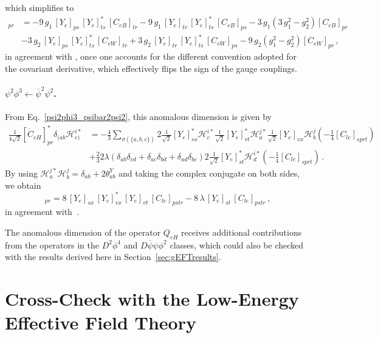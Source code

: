 which simplifies to
\begin{align}
    [\dot C_{eH}]_{pr} &= -9\,g_1\,[Y_e]_{ps}\,[Y_e]^*_{ts}\,[C_{eB}]_{tr}-9\,g_1\,[Y_e]_{tr}\,[Y_e]^*_{ts}\,[C_{eB}]_{ps}-3\,g_1\left(3\,g_1^2-g_2^2\right)[C_{eB}]_{pr}\nonumber \\
    &-3\,g_2\,[Y_e]_{ps}\,[Y_e]^*_{ts}\,[C_{eW}]_{tr}+3\,g_2\,[Y_e]_{tr}\,[Y_e]^*_{ts}\,[C_{eW}]_{ps}-9\,g_2\left(g_1^2-g_2^2\right)[C_{eW}]_{pr}\,,
\end{align}
in agreement with \cite{Alonso:2013hga}, once one accounts for the different convention adopted for the covariant derivative, which effectively flips the sign of the gauge couplings.

\paragraph{$\psi^2\phi^3 \leftarrow \overline \psi^2\psi^2$.}
From Eq.~\eqref{psi2phi3_psibar2psi2}, this anomalous dimension is given by
\begin{align}
    \frac{1}{4\sqrt{2}}[\dot C_{eH}]^*_{pr} \delta_{(ab}\mathcal H_{c)}^{i*} &=  -\frac{4}{3}\sum_{\sigma(\{a,b,c\})}2 \frac{1}{\sqrt 2}[Y_e]^*_{sx}\mathcal H_c^{i*} \frac{1}{\sqrt 2}[Y_e]^*_{vt}\mathcal H_a^{j*} \frac{1}{\sqrt 2}[Y_e]_{vx}\mathcal H_b^{j}\left(-\frac{1}{4}[C_{le}]_{sprt}\right) \nonumber \\
    &+ \frac{2}{3}2\lambda (\delta_{ab}\delta_{cd}+\delta_{ac}\delta_{bd}+\delta_{ad}\delta_{bc})2\frac{1}{\sqrt 2}[Y_e]^*_{st}\mathcal H_d^{i*} \left(-\frac{1}{4}[C_{le}]_{sprt}\right) \,.
\end{align}
By using $\mathcal H_a^{j*}\mathcal H_b^j = \delta_{ab}+2\theta^Y_{ab}$ and taking the complex conjugate on both sides, we obtain
\begin{equation}
    [\dot C_{eH}]_{pr} = 8\, [Y_e]_{sx}\,[Y_e]^*_{vx}\,[Y_e]_{vt}\,[C_{le}]_{pstr} - 8\, \lambda \,[Y_e]_{st} \,[C_{le}]_{pstr}\,,
\end{equation}
in agreement with~\cite{Jenkins:2013zja,Jenkins:2013wua}.

The anomalous dimension of the operator $Q_{eH}$ receives additional contributions from the operators in the $D^2\phi^4$ and $D\overline \psi \psi \phi^2$ classes, which could also be checked with the results derived here in Section~\ref{sec:gEFTresults}.

\section{Cross-Check with the Low-Energy Effective Field Theory}
\label{sec:gEFTLEFT}

